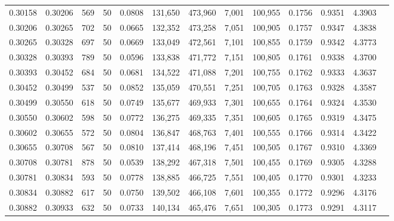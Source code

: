 \begin{tabular}{rrrrrrrrrrrrr}
0.30158 & 0.30206 &   569 &  50 &                                     0.0808 & 131,650 & 473,960 &   7,001 & 100,955 & 0.1756 & 0.9351 & 4.3903 \\
0.30206 & 0.30265 &   702 &  50 &                                     0.0665 & 132,352 & 473,258 &   7,051 & 100,905 & 0.1757 & 0.9347 & 4.3838 \\
0.30265 & 0.30328 &   697 &  50 &                                     0.0669 & 133,049 & 472,561 &   7,101 & 100,855 & 0.1759 & 0.9342 & 4.3773 \\
0.30328 & 0.30393 &   789 &  50 &                                     0.0596 & 133,838 & 471,772 &   7,151 & 100,805 & 0.1761 & 0.9338 & 4.3700 \\
0.30393 & 0.30452 &   684 &  50 &                                     0.0681 & 134,522 & 471,088 &   7,201 & 100,755 & 0.1762 & 0.9333 & 4.3637 \\
0.30452 & 0.30499 &   537 &  50 &                                     0.0852 & 135,059 & 470,551 &   7,251 & 100,705 & 0.1763 & 0.9328 & 4.3587 \\
0.30499 & 0.30550 &   618 &  50 &                                     0.0749 & 135,677 & 469,933 &   7,301 & 100,655 & 0.1764 & 0.9324 & 4.3530 \\
0.30550 & 0.30602 &   598 &  50 &                                     0.0772 & 136,275 & 469,335 &   7,351 & 100,605 & 0.1765 & 0.9319 & 4.3475 \\
0.30602 & 0.30655 &   572 &  50 &                                     0.0804 & 136,847 & 468,763 &   7,401 & 100,555 & 0.1766 & 0.9314 & 4.3422 \\
0.30655 & 0.30708 &   567 &  50 &                                     0.0810 & 137,414 & 468,196 &   7,451 & 100,505 & 0.1767 & 0.9310 & 4.3369 \\
0.30708 & 0.30781 &   878 &  50 &                                     0.0539 & 138,292 & 467,318 &   7,501 & 100,455 & 0.1769 & 0.9305 & 4.3288 \\
0.30781 & 0.30834 &   593 &  50 &                                     0.0778 & 138,885 & 466,725 &   7,551 & 100,405 & 0.1770 & 0.9301 & 4.3233 \\
0.30834 & 0.30882 &   617 &  50 &                                     0.0750 & 139,502 & 466,108 &   7,601 & 100,355 & 0.1772 & 0.9296 & 4.3176 \\
0.30882 & 0.30933 &   632 &  50 &                                     0.0733 & 140,134 & 465,476 &   7,651 & 100,305 & 0.1773 & 0.9291 & 4.3117 \\

\end{tabular}
